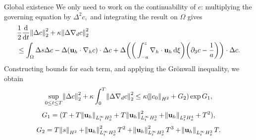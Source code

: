 \documentclass{beamer}
\newcommand*\diff{\mathop{}\!\mathrm{d}}
\begin{document}
\begin{frame}{Global existence}
\changefontsizes{11pt}
We only need to work on the \textcolor{mediumred-violet}{continuability of $c$}: multiplying the governing equation by $\Delta^2 c,$ and integrating the result on $\Omega$ gives
\changefontsizes{10pt}
\begin{equation} \nonumber
\begin{split}
& \frac{1}{2} \frac{\diff}{\diff t} \norm{\Delta c}_2^2 + \kappa \norm{\Delta \nabla_d c}_2^2 \\
& \leq \int_\Omega \Delta s \Delta c - \Delta ( \mathbf{u}_h \cdot \nabla_h c) \cdot \Delta c + \Delta \bigg ( \bigg ( \int_{-a}^z \nabla_h \cdot \mathbf{u}_h \diff \xi \bigg) \bigg ( \partial_3 c - \frac{1}{a} \bigg) \bigg ) \cdot \Delta c.
\end{split}
\end{equation}
\changefontsizes{11pt}
%
Constructing bounds for each term, and applying the Gr\"onwall inequality, we obtain
%
\begin{equation} \nonumber
\sup_{0 \leq t \leq T}\norm{\Delta c}_2^2 + \kappa \int_0^T \norm{\Delta \nabla_d c}_2^2 \leq \kappa (\norm{c_0}_{H^2} + G_2) \exp{G_1},
\end{equation}
%
$$G_1 = (T + T\norm{\mathbf{u}_h}_{L^\infty_t H^3_x} + T \norm{\mathbf{u}_h}_{L^\infty_t H^3_x}^2 + \norm{\mathbf{u}_h}_{L^2_t H^4_x}  +  T^2),$$
$$G_2 = T \norm{s}_{H^2} + \norm{\mathbf{u}_h}_{L^\infty_t H^3_x}^2 T^2 + \norm{\mathbf{u}_h}_{L^\infty_t H^3_x}^2 T^3 + \norm{\mathbf{u}_h}_{L^\infty_t H^3_x} T.$$

\end{frame}
\end{document}

